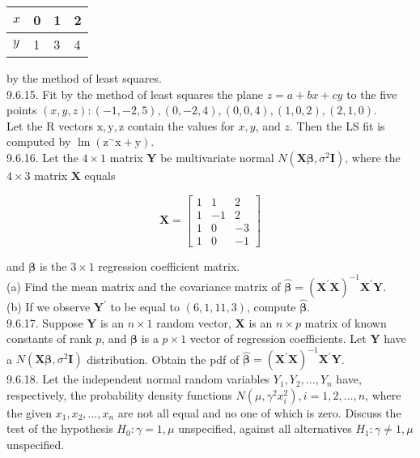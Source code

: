 \begin{center}
\begin{tabular}{l|lll}
$x$ & 0 & 1 & 2 \\
\hline
$y$ & 1 & 3 & 4 \\
\hline
\end{tabular}
\end{center}

by the method of least squares.\\
9.6.15. Fit by the method of least squares the plane $z=a+b x+c y$ to the five points $(x, y, z):(-1,-2,5),(0,-2,4),(0,0,4),(1,0,2),(2,1,0)$.\\
Let the R vectors $\mathrm{x}, \mathrm{y}, \mathrm{z}$ contain the values for $x, y$, and $z$. Then the LS fit is computed by $\operatorname{lm}\left(\mathrm{z}^{\sim} \mathrm{x}+\mathrm{y}\right)$.\\
9.6.16. Let the $4 \times 1$ matrix $\boldsymbol{Y}$ be multivariate normal $N\left(\boldsymbol{X} \boldsymbol{\beta}, \sigma^{2} \boldsymbol{I}\right)$, where the $4 \times 3$ matrix $\boldsymbol{X}$ equals

$$
\boldsymbol{X}=\left[\begin{array}{rrr}
1 & 1 & 2 \\
1 & -1 & 2 \\
1 & 0 & -3 \\
1 & 0 & -1
\end{array}\right]
$$

and $\boldsymbol{\beta}$ is the $3 \times 1$ regression coefficient matrix.\\
(a) Find the mean matrix and the covariance matrix of $\hat{\boldsymbol{\beta}}=\left(\boldsymbol{X}^{\prime} \boldsymbol{X}\right)^{-1} \boldsymbol{X}^{\prime} \boldsymbol{Y}$.\\
(b) If we observe $\boldsymbol{Y}^{\prime}$ to be equal to $(6,1,11,3)$, compute $\hat{\boldsymbol{\beta}}$.\\
9.6.17. Suppose $\boldsymbol{Y}$ is an $n \times 1$ random vector, $\boldsymbol{X}$ is an $n \times p$ matrix of known constants of rank $p$, and $\boldsymbol{\beta}$ is a $p \times 1$ vector of regression coefficients. Let $\boldsymbol{Y}$ have a $N\left(\boldsymbol{X} \boldsymbol{\beta}, \sigma^{2} \boldsymbol{I}\right)$ distribution. Obtain the pdf of $\hat{\boldsymbol{\beta}}=\left(\boldsymbol{X}^{\prime} \boldsymbol{X}\right)^{-1} \boldsymbol{X}^{\prime} \boldsymbol{Y}$.\\
9.6.18. Let the independent normal random variables $Y_{1}, Y_{2}, \ldots, Y_{n}$ have, respectively, the probability density functions $N\left(\mu, \gamma^{2} x_{i}^{2}\right), i=1,2, \ldots, n$, where the given $x_{1}, x_{2}, \ldots, x_{n}$ are not all equal and no one of which is zero. Discuss the test of the hypothesis $H_{0}: \gamma=1, \mu$ unspecified, against all alternatives $H_{1}: \gamma \neq 1, \mu$ unspecified.

